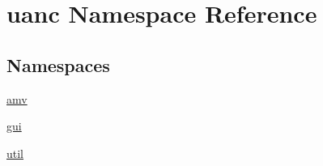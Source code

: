 \hypertarget{namespaceuanc}{}\section{uanc Namespace Reference}
\label{namespaceuanc}
\subsection*{Namespaces}
\begin{DoxyCompactItemize}
\item 
 \hyperlink{namespaceuanc_1_1amv}{amv}
\item 
 \hyperlink{namespaceuanc_1_1gui}{gui}
\item 
 \hyperlink{namespaceuanc_1_1util}{util}
\end{DoxyCompactItemize}
